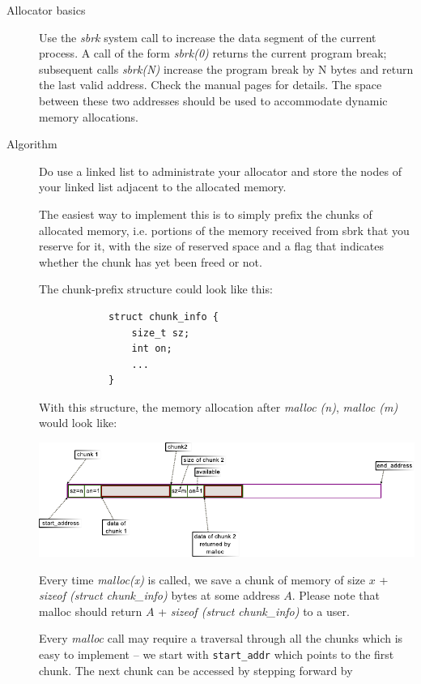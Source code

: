 \documentclass[a4paper,10pt]{scrartcl}
\begin{document}
    \begin{description}
        \item[Allocator basics]
        Use the \textit{sbrk} system call to increase the data segment of
        the current process.  A call of the form \textit{sbrk(0)} returns the
        current program break; subsequent calls \textit{sbrk(N)}
        increase the program break by N bytes and return the last
        valid address. Check the manual pages for details.
        The space between these two addresses
        should be used to accommodate dynamic memory allocations.

        \item[Algorithm]
        Do use a linked list to administrate your allocator and store 
        the nodes of your linked list adjacent to the allocated memory.

        The easiest way to implement this is to simply prefix the
        chunks of allocated memory, i.e. portions of the memory received from
        sbrk that you reserve for it, with the size of reserved space and 
        a flag that indicates whether the chunk has yet been freed or not.

        The chunk-prefix structure could look like this:

        \begin{verbatim}
            struct chunk_info {
                size_t sz;
                int on;
                ...
            }
        \end{verbatim}

        With this structure, the memory allocation after \textit{malloc (n)},
        \textit{malloc (m)} would look like:
       

        \includegraphics[width=.9\textwidth]{task-03-pic.pdf}

        Every time \textit{malloc(x)} is called, we save a chunk of
        memory of size $x$ + \textit{sizeof (struct chunk\_info)} bytes at some
        address $A$.  Please note that malloc should return 
        $A$ + \textit{sizeof (struct chunk\_info)} to a user.  

        Every \textit{malloc} call may require a traversal through all the
        chunks which is easy to implement -- we start with
        \verb|start_addr| which points to the first chunk.
        The next chunk can be accessed by stepping forward by
        

\end{description}
\end{document}
